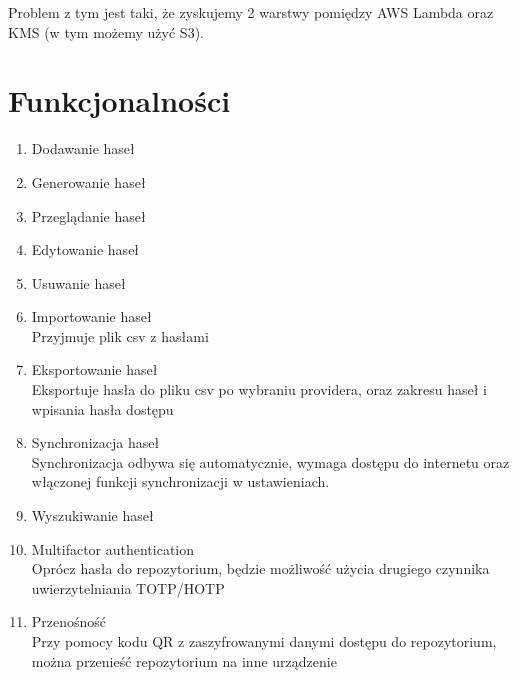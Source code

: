 \documentclass[11pt, a4paper]{article}
\begin{document}
Problem z tym jest taki, że zyskujemy 2 warstwy pomiędzy AWS Lambda oraz KMS (w tym możemy użyć S3).

\section{Funkcjonalności}
\begin{enumerate}
    \item Dodawanie haseł
    \item Generowanie haseł
    \item Przeglądanie haseł
    \item Edytowanie haseł
    \item Usuwanie haseł
    \item Importowanie haseł\\
    Przyjmuje plik csv z hasłami
    \item Eksportowanie haseł\\
    Eksportuje hasła do pliku csv po wybraniu providera, oraz zakresu haseł i wpisania hasła dostępu
    \item Synchronizacja haseł\\
    Synchronizacja odbywa się automatycznie, wymaga dostępu do internetu oraz włączonej funkcji synchronizacji w ustawieniach.
    \item Wyszukiwanie haseł
    \item Multifactor authentication\\
    Oprócz hasła do repozytorium, będzie możliwość użycia drugiego czynnika uwierzytelniania TOTP/HOTP
    \item Przenośność\\
    Przy pomocy kodu QR z zaszyfrowanymi danymi dostępu do repozytorium, można przenieść repozytorium na inne urządzenie 
\end{enumerate}
\end{document}
